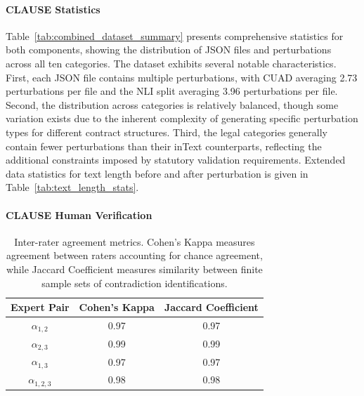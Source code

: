 \documentclass[11pt]{article}
\newcommand{\datasetName}{{\sc CLAUSE}\xspace}
\begin{document}
\paragraph{\datasetName Statistics}
\vspace{-0.5em}
Table~\ref{tab:combined_dataset_summary} presents comprehensive statistics for both components, showing the distribution of JSON files and perturbations across all ten categories. The dataset exhibits several notable characteristics. First, each JSON file contains multiple perturbations, with CUAD averaging 2.73 perturbations per file and the NLI split averaging 3.96 perturbations per file. Second, the distribution across categories is relatively balanced, though some variation exists due to the inherent complexity of generating specific perturbation types for different contract structures. Third, the legal categories generally contain fewer perturbations than their inText counterparts, reflecting the additional constraints imposed by statutory validation requirements. Extended data statistics for text length before and after perturbation is given in Table~\ref{tab:text_length_stats}.
\vspace{-0.5em}


\paragraph{\datasetName Human Verification}


\begin{table}[h]
\setlength{\aboverulesep}{0pt}
\setlength{\belowrulesep}{0pt}
\setlength{\tabcolsep}{2.5pt}
\small
\centering
\begin{tabular}{ccc}
\toprule
\textbf{Expert Pair} & \textbf{Cohen's Kappa} & \textbf{Jaccard Coefficient} \\
\midrule
$\alpha_{1,2}$ & 0.97 & 0.97 \\
$\alpha_{2,3}$ & 0.99 & 0.99 \\
$\alpha_{1,3}$ & 0.97 & 0.97 \\
$\alpha_{1,2,3}$ & 0.98 & 0.98 \\
\bottomrule
\end{tabular}
\caption{\small Inter-rater agreement metrics. Cohen's Kappa measures agreement between raters accounting for chance agreement, while Jaccard Coefficient measures similarity between finite sample sets of contradiction identifications.}
\label{tab:agreement}
\vspace{-0.5em}
\end{table}
\end{document}
